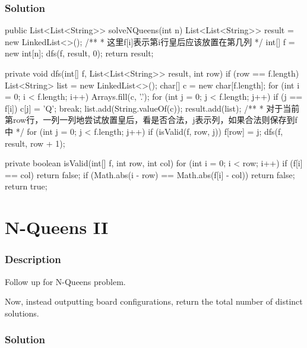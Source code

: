 \subsubsection{Solution}

\begin{Code}
public List<List<String>> solveNQueens(int n) {
    List<List<String>> result = new LinkedList<>();
    /**
     * 这里f[i]表示第i行皇后应该放置在第几列
     */
    int[] f = new int[n];
    dfs(f, result, 0);
    return result;
}

private void dfs(int[] f, List<List<String>> result, int row) {
    if (row == f.length) {
        List<String> list = new LinkedList<>();
        char[] c = new char[f.length];
        for (int i = 0; i < f.length; i++) {
            Arrays.fill(c, '.');
            for (int j = 0; j < f.length; j++) {
                if (j == f[i]) {
                    c[j] = 'Q';
                    break;
                }
            }
            list.add(String.valueOf(c));
        }
        result.add(list);
    }
    /**
     * 对于当前第row行，一列一列地尝试放置皇后，看是否合法，j表示列，如果合法则保存到f中
     */
    for (int j = 0; j < f.length; j++) {
        if (isValid(f, row, j)) {
            f[row] = j;
            dfs(f, result, row + 1);
        }
    }
}

private boolean isValid(int[] f, int row, int col) {
    for (int i = 0; i < row; i++) {
        if (f[i] == col) {
            return false;
        }
        if (Math.abs(i - row) == Math.abs(f[i] - col)) {
            return false;
        }
    }
    return true;
}
\end{Code}

\newpage

\section{N-Queens II} %

\subsubsection{Description}

Follow up for N-Queens problem.

Now, instead outputting board configurations, return the total number of distinct solutions.

\subsubsection{Solution}

